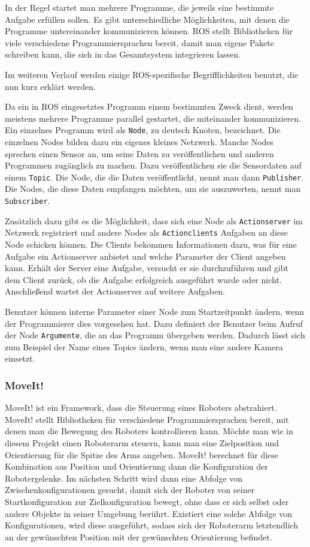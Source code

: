 In der Regel startet man mehrere Programme, die jeweils eine bestimmte Aufgabe erfüllen sollen. Es gibt unterschiedliche Möglichkeiten, mit denen die Programme untereinander kommunizieren können. ROS stellt Bibliotheken für viele verschiedene Programmiersprachen bereit, damit man eigene Pakete schreiben kann, die sich in das Gesamtsystem integrieren lassen.

Im weiteren Verlauf werden einige ROS-spezifische Begrifflichkeiten benutzt, die nun kurz erklärt werden.

Da ein in ROS eingesetztes Programm einem bestimmten Zweck dient, werden meistens mehrere Programme parallel gestartet, die miteinander kommunizieren. Ein einzelnes Programm wird als \texttt{Node}, zu deutsch Knoten, bezeichnet. Die einzelnen Nodes bilden dazu ein eigenes kleines Netzwerk. Manche Nodes sprechen einen Sensor an, um seine Daten zu veröffentlichen und anderen Programmen zugänglich zu machen. Dazu veröffentlichen sie die Sensordaten auf einem \texttt{Topic}. Die Node, die die Daten veröffentlicht, nennt man dann \texttt{Publisher}. Die Nodes, die diese Daten empfangen möchten, um sie auszuwerten, nennt man \texttt{Subscriber}. 

Zusätzlich dazu gibt es die Möglichkeit, dass sich eine Node als \texttt{Actionserver} im Netzwerk registriert und andere Nodes als \texttt{Actionclients} Aufgaben an diese Node schicken können. Die Clients bekommen Informationen dazu, was für eine Aufgabe ein Actionserver anbietet und welche Parameter der Client angeben kann. Erhält der Server eine Aufgabe, versucht er sie durchzuführen und gibt dem Client zurück, ob die Aufgabe erfolgreich ausgeführt wurde oder nicht. Anschließend wartet der Actionserver auf weitere Aufgaben.

Benutzer können interne Parameter einer Node zum Startzeitpunkt ändern, wenn der Programmierer dies vorgesehen hat. Dazu definiert der Benutzer beim Aufruf der Node \texttt{Argumente}, die an das Programm übergeben werden. Dadurch lässt sich zum Beispiel der Name eines Topics ändern, wenn man eine andere Kamera einsetzt. 

\subsubsection{MoveIt!} %
\label{ssub:moveit}
MoveIt! \cite{MoveIt} ist ein Framework, dass die Steuerung eines Roboters abstrahiert. MoveIt! stellt Bibliotheken für verschiedene Programmiersprachen bereit, mit denen man die Bewegung des Roboters kontrollieren kann. Möchte man wie in diesem Projekt einen Roboterarm steuern, kann man eine Zielposition und Orientierung für die Spitze des Arms angeben. MoveIt! berechnet für diese Kombination aus Position und Orientierung dann die Konfiguration der Robotergelenke. Im nächsten Schritt wird dann eine Abfolge von Zwischenkonfigurationen gesucht, damit sich der Roboter von seiner Startkonfiguration zur Zielkonfiguration bewegt, ohne dass er sich selbst oder andere Objekte in seiner Umgebung berührt. Existiert eine solche Abfolge von Konfigurationen, wird diese ausgeführt, sodass sich der Roboterarm letztendlich an der gewünschten Position mit der gewünschten Orientierung befindet.

